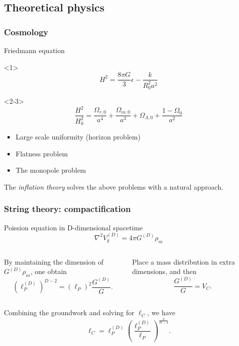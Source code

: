 \documentclass{beamer}
\begin{document}
\subsection{Theoretical physics}
\begin{frame}
  \frametitle{Cosmology}
    \begin{alertblock}{Friedmann equation}
      \begin{onlyenv}<1>
        $$H^2 = \frac{8\pi G}{3}\epsilon-\frac{k}{R_0^2a^2}$$
      \end{onlyenv}
      \begin{onlyenv}<2-3>
        $$\frac{H^2}{H_0^2} =
        \frac{\Omega_{r,0}}{a^4} + \frac{\Omega_{m,0}}{a^3} +
        \Omega_{\Lambda,0} + \frac{1-\Omega_0}{a^2}$$
      \end{onlyenv}
  \end{alertblock}
  
  \begin{itemize}
  \item<3> Large scale uniformity (horizon problem)
  \item<3> Flatness problem
  \item<3> The monopole problem
  \end{itemize} \pause
  The \textit{inflation theory} solves the above problems with a natural
  approach.

\end{frame}


\begin{frame}
  \frametitle{String theory: compactification}
  \begin{alertblock}{Poission equation in D-dimensional spacetime}
    $$\nabla^2V_g^{(D)} = 4\pi G^{(D)}\rho_m$$ 
  \end{alertblock}
  \begin{columns}
    By maintaining the dimension of $G^{(D)}\rho_m$, one obtain
    $$(\ell_P^{(D)})^{D-2} = (\ell_P)^2\frac{G^{(D)}}{G}.$$

    Place a mass distribution in extra dimensions, and then 
    $$\frac{G^{(D)}}{G} = V_C.$$
  \end{columns} \pause
  Combining the groundwork and solving for $\ell_C$, we have
  $$\ell_C = \ell_P^{(D)}(\frac{\ell_P^{(D)}}{\ell_P})^{\frac{2}{D-4}}.$$
  
\end{frame}
\end{document}
